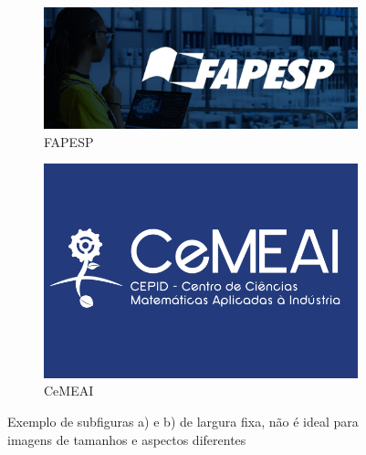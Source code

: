 \begin{figure}[H]
    \centering
    \begin{subfigure}{0.48\linewidth}
        \centering
        \includegraphics[width=\linewidth]{Figuras/FAPESP.jpg}
        \caption{FAPESP \cite{fapesp}}
    \end{subfigure}
    \hfill
    \begin{subfigure}{0.48\linewidth}
        \centering
        \includegraphics[width=\linewidth]{Figuras/CEMEAI.png}
        \caption{CeMEAI \cite{cemeai}}
    \end{subfigure}
    \caption{Exemplo de subfiguras a) e b) de largura fixa, não é ideal para imagens de tamanhos e aspectos diferentes}
    \label{fig:largurafixa1}
\end{figure}

